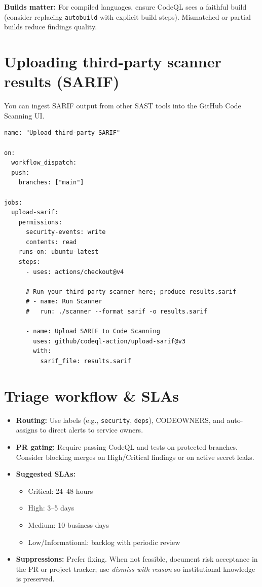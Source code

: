 \documentclass[11pt]{article}
\begin{document}
\begin{tcolorbox}
\textbf{Builds matter:} For compiled languages, ensure CodeQL sees a faithful build (consider replacing \texttt{autobuild} with explicit build steps). Mismatched or partial builds reduce findings quality.
\end{tcolorbox}
\newpage

\section{Uploading third-party scanner results (SARIF)}
You can ingest SARIF output from other SAST tools into the GitHub Code Scanning UI.

\begin{listing}[H]
\caption{Minimal SARIF upload workflow}
\begin{verbatim}
name: "Upload third-party SARIF"

on:
  workflow_dispatch:
  push:
    branches: ["main"]

jobs:
  upload-sarif:
    permissions:
      security-events: write
      contents: read
    runs-on: ubuntu-latest
    steps:
      - uses: actions/checkout@v4

      # Run your third-party scanner here; produce results.sarif
      # - name: Run Scanner
      #   run: ./scanner --format sarif -o results.sarif

      - name: Upload SARIF to Code Scanning
        uses: github/codeql-action/upload-sarif@v3
        with:
          sarif_file: results.sarif
\end{verbatim}
\end{listing}

\section{Triage workflow \& SLAs}
\begin{itemize}
  \item \textbf{Routing:} Use labels (e.g., \texttt{security}, \texttt{deps}), CODEOWNERS, and auto-assigns to direct alerts to service owners.
  \item \textbf{PR gating:} Require passing CodeQL and tests on protected branches. Consider blocking merges on High/Critical findings or on active secret leaks.
  \item \textbf{Suggested SLAs:}
    \begin{itemize}
      \item Critical: 24--48 hours
      \item High: 3--5 days
      \item Medium: 10 business days
      \item Low/Informational: backlog with periodic review
    \end{itemize}
  \item \textbf{Suppressions:} Prefer fixing. When not feasible, document risk acceptance in the PR or project tracker; use \emph{dismiss with reason} so institutional knowledge is preserved.
\end{itemize}
\newpage
\end{document}
